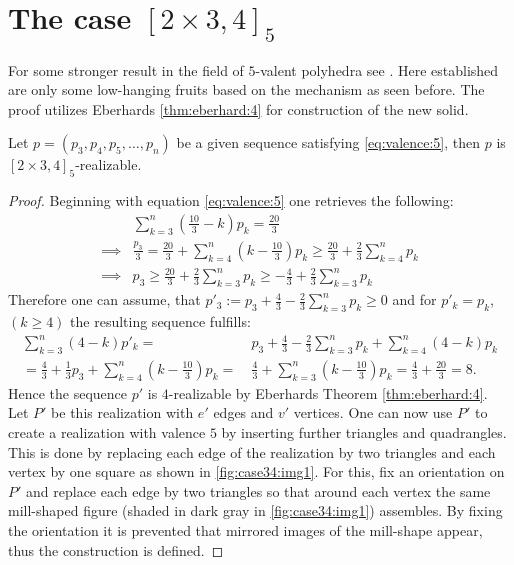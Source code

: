 \section{The case $[2 \times 3, 4]_5$}
For some stronger result in the field of $5$-valent polyhedra see \cite{trenkler1975face}. Here established are only some low-hanging fruits based on the mechanism as seen before. The proof utilizes Eberhards \autoref{thm:eberhard:4} for construction of the new solid.
\begin{theorem}
  Let $p = (p_3, p_4, p_5, \dots, p_n)$ be a given sequence satisfying \autoref{eq:valence:5}, then $p$ is $[2\times3, 4]_5$-realizable.
  \begin{proof}
    Beginning with equation \autoref{eq:valence:5} one retrieves the following:
    \begin{align*}
      &\sum_{k=3}^n \left( \frac{10}{3} - k \right) p_k = \frac{20}{3} \\
      \implies & \frac{p_3}{3} = \frac{20}{3} + \sum_{k=4}^n \left(k - \frac{10}{3} \right) p_k \geq \frac{20}{3} + \frac{2}{3} \sum_{k=4}^n p_k \\
      \implies & p_3 \geq \frac{20}{3} + \frac{2}{3} \sum_{k=3}^n p_k \geq - \frac{4}{3} + \frac{2}{3} \sum_{k=3}^n p_k
    \end{align*}
    Therefore one can assume, that $p'_3 := p_3 + \frac{4}{3} - \frac{2}{3} \sum_{k=3}^n p_k \geq 0$ and for $p'_k = p_k$, $(k\geq 4)$ the resulting sequence fulfills:
    \begin{align*}
      \sum_{k=3}^n (4 - k) p'_k =&~ p_3 + \frac{4}{3} - \frac{2}{3} \sum_{k=3}^n p_k + \sum_{k=4}^n (4 - k) p_k \\
      = \frac{4}{3} + \frac{1}{3} p_3 + \sum_{k=4}^n \left(k - \frac{10}{3} \right) p_k =&~ \frac{4}{3} + \sum_{k=3}^n \left(k - \frac{10}{3} \right) p_k = \frac{4}{3} + \frac{20}{3} = 8.
    \end{align*}
    Hence the sequence $p'$ is $4$-realizable by Eberhards Theorem \autoref{thm:eberhard:4}. Let $P'$ be this realization with $e'$ edges and $v'$ vertices. One can now use $P'$ to create a realization with valence $5$ by inserting further triangles and quadrangles. This is done by replacing each edge of the realization by two triangles and each vertex by one square as shown in \autoref{fig:case34:img1}. For this, fix an orientation on $P'$ and replace each edge by two triangles so that around each vertex the same mill-shaped figure (shaded in dark gray in \autoref{fig:case34:img1}) assembles. By fixing the orientation it is prevented that mirrored images of the mill-shape appear, thus the construction is defined.


\end{proof}
\end{theorem}
